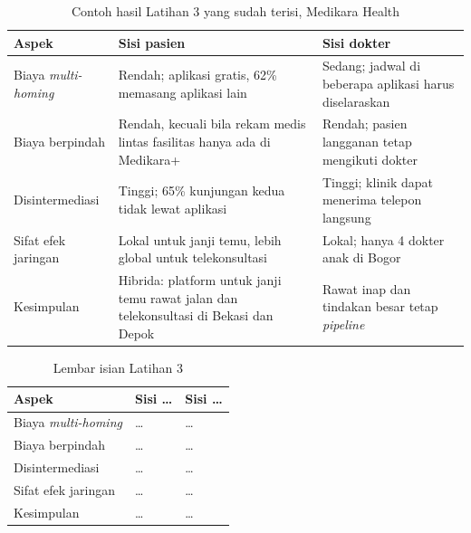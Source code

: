 \begin{table}[!htb]
  \centering
  \caption{Contoh hasil Latihan 3 yang sudah terisi, Medikara Health}
  \label{tab:ch02-lat3-contoh}
  \small
  \begin{tabularx}{\textwidth}{lXX}
    \hline
    \textbf{Aspek} & \textbf{Sisi pasien} & \textbf{Sisi dokter} \\
    \hline
    Biaya \textit{multi-homing} & Rendah; aplikasi gratis, 62\% memasang aplikasi lain & Sedang; jadwal di beberapa aplikasi harus diselaraskan \\
    \hline
    Biaya berpindah & Rendah, kecuali bila rekam medis lintas fasilitas hanya ada di Medikara+ & Rendah; pasien langganan tetap mengikuti dokter \\
    \hline
    Disintermediasi & Tinggi; 65\% kunjungan kedua tidak lewat aplikasi & Tinggi; klinik dapat menerima telepon langsung \\
    \hline
    Sifat efek jaringan & Lokal untuk janji temu, lebih global untuk telekonsultasi & Lokal; hanya 4 dokter anak di Bogor \\
    \hline
    Kesimpulan & Hibrida: platform untuk janji temu rawat jalan dan telekonsultasi di Bekasi dan Depok & Rawat inap dan tindakan besar tetap \textit{pipeline} \\
    \hline
  \end{tabularx}
\end{table}

\begin{table}[!htb]
  \centering
  \caption{Lembar isian Latihan 3}
  \label{tab:ch02-lat3-hasil}
  \begin{tabularx}{\textwidth}{lXX}
    \hline
    \textbf{Aspek} & \textbf{Sisi \dots} & \textbf{Sisi \dots} \\
    \hline
    Biaya \textit{multi-homing} & \dots & \dots \\
    \hline
    Biaya berpindah & \dots & \dots \\
    \hline
    Disintermediasi & \dots & \dots \\
    \hline
    Sifat efek jaringan & \dots & \dots \\
    \hline
    Kesimpulan & \dots & \dots \\
    \hline
  \end{tabularx}
\end{table}
